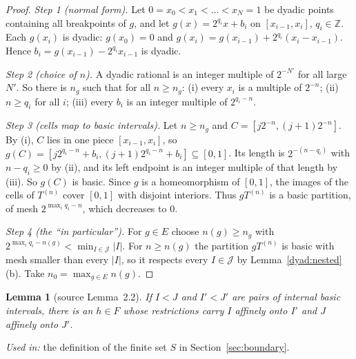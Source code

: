 \documentclass[11pt]{article}
\newcommand{\Z}{\mathbb Z}
\newtheorem{lemma}[theorem]{Lemma}
\theoremstyle{definition}
\numberwithin{equation}{section}
\begin{document}
\begin{proof}
\emph{Step 1 (normal form).} Let \(0=x_0<x_1<\dots<x_N=1\) be dyadic
points containing all breakpoints of \(g\), and let
\(g(x)=2^{q_i}x+b_i\) on \([x_{i-1},x_i]\), \(q_i\in\Z\). Each \(g(x_i)\)
is dyadic: \(g(x_0)=0\) and
\(g(x_i)=g(x_{i-1})+2^{q_i}(x_i-x_{i-1})\). Hence
\(b_i=g(x_{i-1})-2^{q_i}x_{i-1}\) is dyadic.

\emph{Step 2 (choice of \(n\)).} A dyadic rational is an integer multiple
of \(2^{-N'}\) for all large \(N'\). So there is \(n_g\) such that for all
\(n\ge n_g\): (i) every \(x_i\) is a multiple of \(2^{-n}\); (ii)
\(n\ge q_i\) for all \(i\); (iii) every \(b_i\) is an integer multiple of
\(2^{q_i-n}\).

\emph{Step 3 (cells map to basic intervals).} Let \(n\ge n_g\) and
\(C=[j2^{-n},(j+1)2^{-n}]\). By (i), \(C\) lies in one piece
\([x_{i-1},x_i]\), so
\(g(C)=[j2^{q_i-n}+b_i,(j+1)2^{q_i-n}+b_i]\subseteq[0,1]\). Its length is
\(2^{-(n-q_i)}\) with \(n-q_i\ge0\) by (ii), and its left endpoint is an
integer multiple of that length by (iii). So \(g(C)\) is basic. Since
\(g\) is a homeomorphism of \([0,1]\), the images of the cells of
\(T^{(n)}\) cover \([0,1]\) with disjoint interiors. Thus \(gT^{(n)}\) is
a basic partition, of mesh \(2^{\max_iq_i-n}\), which decreases to \(0\).

\emph{Step 4 (the ``in particular'').} For \(g\in E\) choose
\(n(g)\ge n_g\) with \(2^{\max_iq_i-n(g)}<\min_{I\in\mathcal J}|I|\). For
\(n\ge n(g)\) the partition \(gT^{(n)}\) is basic with mesh smaller than
every \(|I|\), so it respects every \(I\in\mathcal J\) by
Lemma~\ref{dyad:nested}(b). Take \(n_0=\max_{g\in E}n(g)\).
\end{proof}

\begin{lemma}[source Lemma~2.2]\label{dyad:transport}
If \(I<J\) and \(I'<J'\) are pairs of internal basic intervals, there is
an \(h\in F\) whose restrictions carry \(I\) affinely onto \(I'\) and
\(J\) affinely onto \(J'\).
\end{lemma}
\noindent\emph{Used in:} the definition of the finite set \(S\) in
Section~\ref{sec:boundary}.
\end{document}

